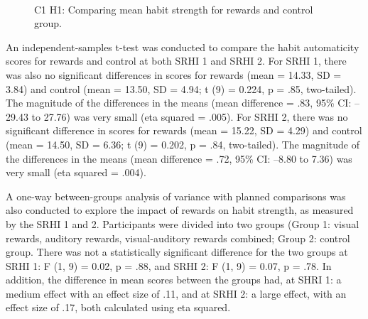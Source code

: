 \documentclass{scaffold/sigchi}
\begin{document}
\begin{figure}
  \centering
  \caption{C1 H1: Comparing mean habit strength for rewards and control group.}~\label{fig:habit_4_item_survey1_v_survey2}
\end{figure}

An independent-samples t-test was conducted to compare the habit automaticity scores
for rewards and control at both SRHI 1 and SRHI 2.  For SRHI 1, there was also no significant differences in scores for rewards (mean = 14.33, SD = 3.84) and control (mean = 13.50, SD = 4.94; t (9) = 0.224, p = .85,
two-tailed). The magnitude of the differences in the means (mean difference = .83,
95\% CI: –29.43 to 27.76) was very small (eta squared = .005). For SRHI 2, there was no significant difference in scores for rewards
(mean = 15.22, SD = 4.29) and control (mean = 14.50, SD = 6.36; t (9) = 0.202, p = .84,
two-tailed). The magnitude of the differences in the means (mean difference = .72,
95\% CI: –8.80 to 7.36) was very small (eta squared = .004).


A one-way between-groups analysis of variance with planned comparisons was also conducted to explore the impact of rewards on habit strength, as measured by the SRHI 1 and 2. Participants were divided into two groups (Group 1: visual rewards, auditory rewards, visual-auditory rewards combined; Group 2: control group. There was not a
statistically significant difference for the two groups at SRHI 1: F (1, 9) = 0.02, p = .88, and SRHI 2: F (1, 9) = 0.07, p = .78. In addition, the difference in mean scores between the groups had, at SHRI 1: a medium effect with an effect size of .11, and at SRHI 2: a large effect, with an effect size of .17, both calculated using eta squared.
\end{document}
